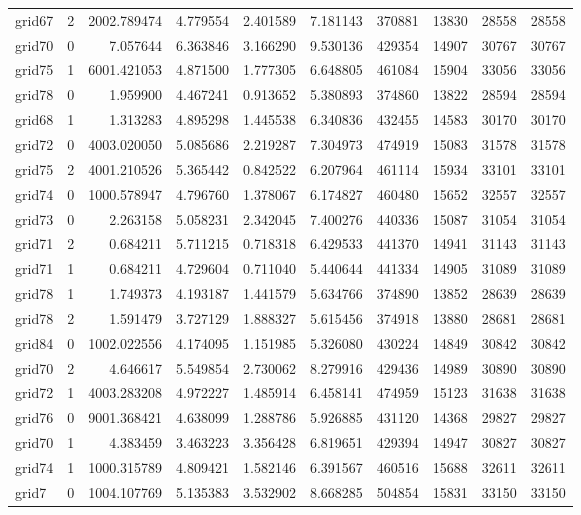 \begin{longtable}{|l|r|r|r|r|r|r|r|r|r|}
grid67 & 2 & 2002.789474 & 4.779554 & 2.401589 & 7.181143 & 370881 & 13830 & 28558 & 28558 \\
grid70 & 0 & 7.057644 & 6.363846 & 3.166290 & 9.530136 & 429354 & 14907 & 30767 & 30767 \\
grid75 & 1 & 6001.421053 & 4.871500 & 1.777305 & 6.648805 & 461084 & 15904 & 33056 & 33056 \\
grid78 & 0 & 1.959900 & 4.467241 & 0.913652 & 5.380893 & 374860 & 13822 & 28594 & 28594 \\
grid68 & 1 & 1.313283 & 4.895298 & 1.445538 & 6.340836 & 432455 & 14583 & 30170 & 30170 \\
grid72 & 0 & 4003.020050 & 5.085686 & 2.219287 & 7.304973 & 474919 & 15083 & 31578 & 31578 \\
grid75 & 2 & 4001.210526 & 5.365442 & 0.842522 & 6.207964 & 461114 & 15934 & 33101 & 33101 \\
grid74 & 0 & 1000.578947 & 4.796760 & 1.378067 & 6.174827 & 460480 & 15652 & 32557 & 32557 \\
grid73 & 0 & 2.263158 & 5.058231 & 2.342045 & 7.400276 & 440336 & 15087 & 31054 & 31054 \\
grid71 & 2 & 0.684211 & 5.711215 & 0.718318 & 6.429533 & 441370 & 14941 & 31143 & 31143 \\
grid71 & 1 & 0.684211 & 4.729604 & 0.711040 & 5.440644 & 441334 & 14905 & 31089 & 31089 \\
grid78 & 1 & 1.749373 & 4.193187 & 1.441579 & 5.634766 & 374890 & 13852 & 28639 & 28639 \\
grid78 & 2 & 1.591479 & 3.727129 & 1.888327 & 5.615456 & 374918 & 13880 & 28681 & 28681 \\
grid84 & 0 & 1002.022556 & 4.174095 & 1.151985 & 5.326080 & 430224 & 14849 & 30842 & 30842 \\
grid70 & 2 & 4.646617 & 5.549854 & 2.730062 & 8.279916 & 429436 & 14989 & 30890 & 30890 \\
grid72 & 1 & 4003.283208 & 4.972227 & 1.485914 & 6.458141 & 474959 & 15123 & 31638 & 31638 \\
grid76 & 0 & 9001.368421 & 4.638099 & 1.288786 & 5.926885 & 431120 & 14368 & 29827 & 29827 \\
grid70 & 1 & 4.383459 & 3.463223 & 3.356428 & 6.819651 & 429394 & 14947 & 30827 & 30827 \\
grid74 & 1 & 1000.315789 & 4.809421 & 1.582146 & 6.391567 & 460516 & 15688 & 32611 & 32611 \\
grid7 & 0 & 1004.107769 & 5.135383 & 3.532902 & 8.668285 & 504854 & 15831 & 33150 & 33150 \\

\end{longtable}
